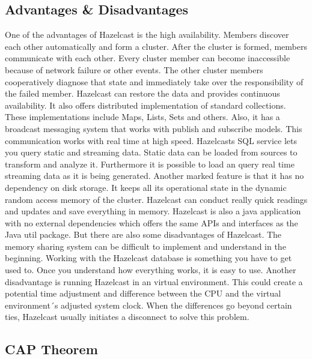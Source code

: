 \subsection{Advantages \& Disadvantages} \label{subsec:advantagesDisadvantagesHazelcast}

One of the advantages of Hazelcast is the high availability. Members discover each other automatically and form a cluster. 
After the cluster is formed, members communicate with each other.  Every cluster member can become inaccessible because of network 
failure or other events. The other cluster members cooperatively diagnose that state and immediately take over the responsibility of the failed member. Hazelcast can restore the data and provides continuous availability. 
It also offers distributed implementation of standard collections. These implementations include Maps, Lists, Sets and others. Also, 
it has a broadcast messaging system that works with publish and subscribe models. This communication works with real time at high speed. 
Hazelcasts SQL service lets you query static and streaming data. Static data can be loaded from sources to transform and analyze it. 
Furthermore it is possible to load an query real time streaming data as it is being generated.
Another marked feature is that it has no dependency on disk storage. It keeps all its operational state in the dynamic random access 
memory of the cluster. Hazelcast can conduct really quick readings and updates and save everything in memory.
Hazelcast is also a java application with no external dependencies which offers the same APIs and interfaces as the Java util package. 
But there are also some disadvantages of Hazelcast. The memory sharing system can be difficult to implement and understand in the 
beginning. Working with the Hazelcast database is something you have to get used to. Once you understand how everything works, it is easy to use. 
Another disadvantage is running Hazelcast in an virtual environment. This could create a potential time adjustment and difference 
between the CPU and the virtual environment´s adjusted system clock. When the differences go beyond certain ties, Hazelcast usually 
initiates a disconnect to solve this problem. \parencite{Oguejiofor.05.10.2022}

\subsection{CAP Theorem} \label{subsec:capTheoremHazelcast}

